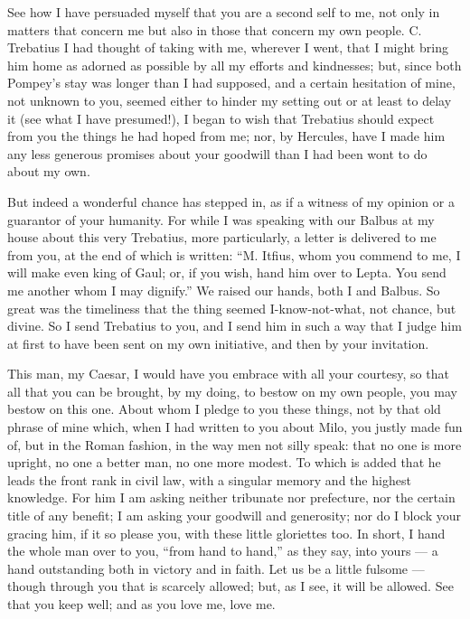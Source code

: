 

 See how I have persuaded myself that you are a second self to me, not only in matters that concern me but also in those that concern my own people. C. Trebatius I had thought of taking with me, wherever I went, that I might bring him home as adorned as possible by all my efforts and kindnesses; but, since both Pompey's stay was longer than I had supposed, and a certain hesitation of mine, not unknown to you, seemed either to hinder my setting out or at least to delay it (see what I have presumed!), I began to wish that Trebatius should expect from you the things he had hoped from me; nor, by Hercules, have I made him any less generous promises about your goodwill than I had been wont to do about my own.

 But indeed a wonderful chance has stepped in, as if a witness of my opinion or a guarantor of your humanity. For while I was speaking with our Balbus at my house about this very Trebatius, more particularly, a letter is delivered to me from you, at the end of which is written: ``M. Itfius, whom you commend to me, I will make even king of Gaul; or, if you wish, hand him over to Lepta. You send me another whom I may dignify.'' We raised our hands, both I and Balbus. So great was the timeliness that the thing seemed I-know-not-what, not chance, but divine. So I send Trebatius to you, and I send him in such a way that I judge him at first to have been sent on my own initiative, and then by your invitation.

 This man, my Caesar, I would have you embrace with all your courtesy, so that all that you can be brought, by my doing, to bestow on my own people, you may bestow on this one. About whom I pledge to you these things, not by that old phrase of mine which, when I had written to you about Milo, you justly made fun of, but in the Roman fashion, in the way men not silly speak: that no one is more upright, no one a better man, no one more modest. To which is added that he leads the front rank in civil law, with a singular memory and the highest knowledge. For him I am asking neither tribunate nor prefecture, nor the certain title of any benefit; I am asking your goodwill and generosity; nor do I block your gracing him, if it so please you, with these little gloriettes too. In short, I hand the whole man over to you, ``from hand to hand,'' as they say, into yours --- a hand outstanding both in victory and in faith. Let us be a little fulsome --- though through you that is scarcely allowed; but, as I see, it will be allowed. See that you keep well; and as you love me, love me.
